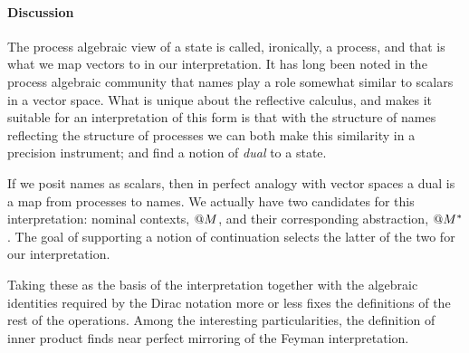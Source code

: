 \begin{table}[htp]\label{tbl:core_qm_op_defns}
  \caption{QM - operational definitions}
\end{table}

\paragraph{Discussion}
The process algebraic view of a state is called, ironically, a
process, and that is what we map vectors to in our interpretation. It
has long been noted in the process algebraic community that names play
a role somewhat similar to scalars in a vector space. What is unique
about the reflective calculus, and makes it suitable for an
interpretation of this form is that with the structure of names
reflecting the structure of processes we can both make this similarity
in a precision instrument; and find a notion of \emph{dual} to a
state. 

If we posit names as scalars, then in perfect analogy with vector
spaces a dual is a map from processes to names. We actually have two
candidates for this interpretation: nominal contexts, $\mathsf{@} M$,
and their corresponding abstraction, $\mathsf{@} M^{*}$. The goal of
supporting a notion of continuation selects the latter of the two for
our interpretation.

Taking these as the basis of the interpretation together with the
algebraic identities required by the Dirac notation more or less fixes
the definitions of the rest of the operations. Among the interesting
particularities, the definition of inner product finds near perfect
mirroring of the Feyman interpretation.

